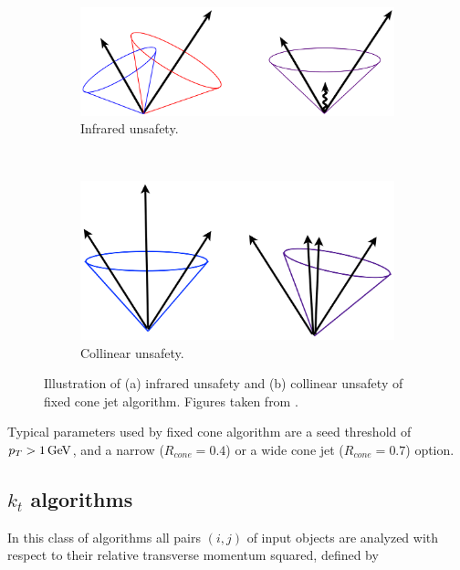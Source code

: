 \begin{figure}[t]
  \centering
  \begin{subfigure}[b]{0.85\textwidth}
    \includegraphics[width=\textwidth]{Chapter2/IRsafety.png}
    \caption{Infrared unsafety.}
    \label{fig:IRsafety}
  \end{subfigure}
  ~
  \begin{subfigure}[b]{0.8\textwidth}
    \includegraphics[width=\textwidth]{Chapter2/ColSafety.png}
    \caption{Collinear unsafety.}
    \label{fig:ColSafety}
  \end{subfigure}
  \caption[Illustration of (a) infrared unsafety and (b) collinear unsafety
          of fixed cone jet algorithm.]
          {Illustration of (a) infrared unsafety and (b) collinear unsafety
          of fixed cone jet algorithm.
          Figures taken from \cite{JetTheoreticalPictures}.}
  \label{fig:JetIRCOLsafety}
\end{figure}

Typical parameters used by fixed cone algorithm are a seed threshold of $p_{T} > 1 \,\text{GeV}$,
and a narrow ($R_{cone} = 0.4$) or a wide cone jet ($R_{cone} = 0.7$) option.

\subsection{$k_t$ algorithms}

In this class of algorithms all pairs $(i,j)$ of input objects are analyzed with
respect to their relative transverse momentum squared, defined by 

